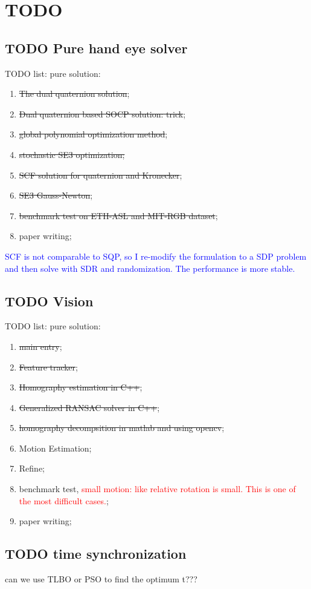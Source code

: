 \documentclass[a4paper]{report}
\begin{document}
\chapter{TODO}
\section{TODO Pure hand eye solver}
TODO list:
pure solution:
\begin{enumerate}
	\item \sout{The dual quaternion solution};
	\item \sout{Dual quaternion based SOCP solution: trick};
	\item \sout{global polynomial optimization method};
	\item \sout{stochastic SE3 optimization;}
	\item \sout{SCF solution for quaternion and Kronecker};
	\item \sout{SE3 Gauss-Newton};
	\item \sout{benchmark test on ETH-ASL and MIT-RGB dataset};
	\item paper writing;
\end{enumerate}
\textcolor{blue}{SCF is not comparable to SQP, so I re-modify the formulation to a SDP problem and then solve with SDR and randomization. The performance is more stable.}


\section{TODO Vision}
TODO list:
pure solution:
\begin{enumerate}
	\item \sout{main entry};
	\item \sout{Feature tracker};
	\item \sout{Homography estimation in C++};
	\item \sout{Generalized RANSAC solver in C++};
	\item \sout{homography decompsition in matlab and using opencv};
	\item Motion Estimation;
	\item Refine;
	\item benchmark test, \textcolor{red}{small motion: like relative rotation is small. This is one of the most difficult cases.};
	\item paper writing;
\end{enumerate}

\section{TODO time synchronization}
can we use TLBO or PSO to find the optimum t???
\end{document}

